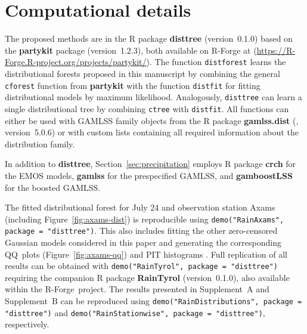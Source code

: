 \documentclass[aoas, preprint]{imsart}
\numberwithin{equation}{subsection}
\begin{document}
\section*{Computational details}

The proposed methods are in the \textsf{R} package \textbf{disttree}
(version~0.1.0) based on the \textbf{partykit}
package (version~1.2.3), both available 
on \textsf{R}-Forge at
(\url{https://R-Forge.R-project.org/projects/partykit/}). 
The function \texttt{distforest} learns the distributional forests proposed
in this manuscript by combining the general \texttt{cforest} function from
\textbf{partykit} with the function \texttt{distfit} for fitting distributional
models by maximum likelihood. Analogously, \texttt{disttree} can learn a single
distributional tree by combining \texttt{ctree} with \texttt{distfit}.
All functions can either be used with GAMLSS family objects from the \textsf{R} package \textbf{gamlss.dist} 
(\citealp{Stasinopoulos+Rigby:2007}, version~5.0.6)
or with custom lists containing all required information about the distribution family.

In addition to \textbf{disttree}, Section~\ref{sec:precipitation} employs
\textsf{R} package \textbf{crch}  
\citep[version~1.0.1]{Messner+Mayr+Zeileis:2016} for the EMOS 
models, \textbf{gamlss}
\citep[version~5.1.0]{Stasinopoulos+Rigby:2007} for the 
prespecified GAMLSS, and \textbf{gamboostLSS}
\citep[version~2.0.1]{Hofner+Mayr+Schmid:2016} for the boosted GAMLSS.

The fitted distributional forest for July 24 and
observation station Axams (including Figure~\ref{fig:axams-dist})
is reproducible using \texttt{demo("RainAxams", package = "disttree")}.
This also includes fitting the other zero-censored
Gaussian models considered in this paper and generating the corresponding 
QQ~plots (Figure~\ref{fig:axams-qq}) and PIT histograms 
\citep[Supplement~B]{Schlosser+Hothorn+Stauffer:2019b}.
Full replication of all results can be obtained with
\texttt{demo("RainTyrol", package = "disttree")}
requiring the companion \textsf{R} package \textbf{RainTyrol} 
(version~0.1.0),
also available within the \textsf{R}-Forge~project.
The results presented in Supplement~A \citep{Schlosser+Hothorn+Stauffer:2019a} and 
Supplement~B \citep{Schlosser+Hothorn+Stauffer:2019b} can be reproduced using
\texttt{demo("RainDistributions", package = "disttree")} and 
\texttt{demo("RainStationwise", package = "disttree")}, respectively.
\end{document}
